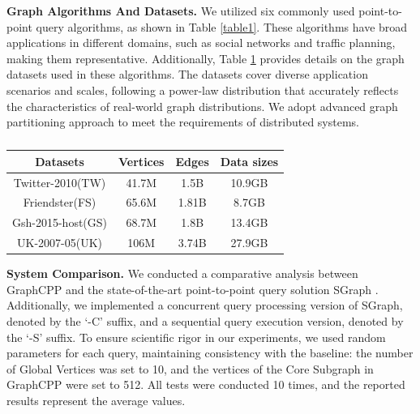 \documentclass[10pt,journal,compsoc]{IEEEtran}
\begin{document}
{\bf{Graph Algorithms And Datasets.}} 
We utilized six commonly used point-to-point query algorithms, as shown in Table \ref{table1}. These algorithms have broad applications in different domains, such as social networks and traffic planning, making them representative. Additionally, Table \ref{table3} provides details on the graph datasets used in these algorithms. The datasets cover diverse application scenarios and scales, following a power-law distribution that accurately reflects the characteristics of real-world graph distributions. 
We adopt advanced graph partitioning approach \cite{china1} to meet the requirements of distributed systems.

\begin{table}[h]
    \centering
    \renewcommand\arraystretch{1.2}
    \scriptsize
    \begin{tabular}{c c c c}
    \hline
    \rule{0pt}{8pt} 
    Datasets          & Vertices & Edges  & Data sizes \\
    \hline
    \rule{0pt}{8pt}
    Twitter-2010(TW) \cite{twitter}   & 41.7M    & 1.5B   & 10.9GB     \\
    Friendster(FS) \cite{Friendster}    & 65.6M     & 1.81B    & 8.7GB      \\
    Gsh-2015-host(GS) \cite{bubing}  & 68.7M    & 1.8B   & 13.4GB     \\
    UK-2007-05(UK) \cite{timeaware}     & 106M     & 3.74B  & 27.9GB     \\
    \hline
    \end{tabular}
    \caption{}
    \label{table3}
    \vspace{-0.3cm}
\end{table}

{\bf{System Comparison.}} We conducted a comparative analysis between GraphCPP and the state-of-the-art point-to-point query solution SGraph \cite{sgraph}. Additionally, we implemented a concurrent query processing version of SGraph, denoted by the `-C' suffix, and a sequential query execution version, denoted by the `-S' suffix.
To ensure scientific rigor in our experiments, we used random parameters for each query, maintaining consistency with the baseline: the number of Global Vertices was set to 10, and the vertices of the Core Subgraph in GraphCPP were set to 512. All tests were conducted 10 times, and the reported results represent the average values.


\vspace{-8pt}
\end{document}
